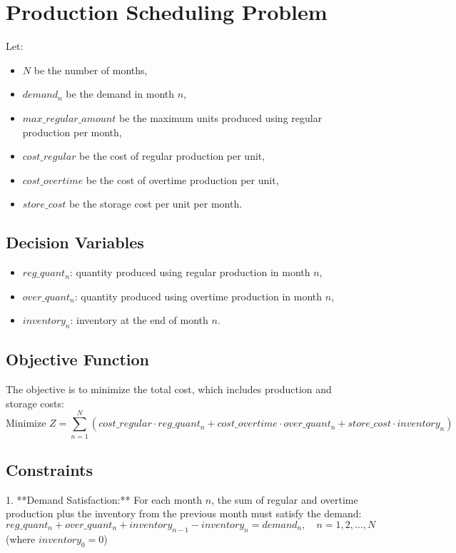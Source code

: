 \documentclass{article}
\begin{document}
\section*{Production Scheduling Problem}

Let:
\begin{itemize}
    \item $N$ be the number of months,
    \item $demand_n$ be the demand in month $n$,
    \item $max\_regular\_amount$ be the maximum units produced using regular production per month,
    \item $cost\_regular$ be the cost of regular production per unit,
    \item $cost\_overtime$ be the cost of overtime production per unit,
    \item $store\_cost$ be the storage cost per unit per month.
\end{itemize}

\subsection*{Decision Variables}
\begin{itemize}
    \item $reg\_quant_n$: quantity produced using regular production in month $n$,
    \item $over\_quant_n$: quantity produced using overtime production in month $n$,
    \item $inventory_n$: inventory at the end of month $n$.
\end{itemize}

\subsection*{Objective Function}
The objective is to minimize the total cost, which includes production and storage costs:
\[
\text{Minimize } Z = \sum_{n=1}^{N} \left( cost\_regular \cdot reg\_quant_n + cost\_overtime \cdot over\_quant_n + store\_cost \cdot inventory_n \right)
\]

\subsection*{Constraints}

1. **Demand Satisfaction:**
   For each month $n$, the sum of regular and overtime production plus the inventory from the previous month must satisfy the demand:
   \[
   reg\_quant_n + over\_quant_n + inventory_{n-1} - inventory_n = demand_n, \quad n = 1, 2, \ldots, N
   \]
   (where $inventory_0 = 0$)
\end{document}
